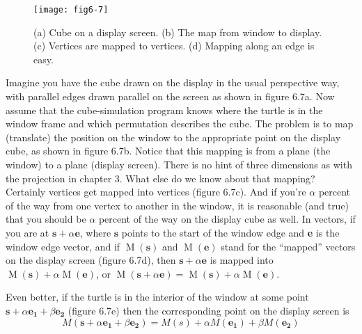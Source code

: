 \documentclass{book}
\begin{document}
\begin{figure}
\begin{center}
\texttt{[image: fig6-7]}
\caption{(a) Cube on a display screen. (b) The map from window to display. (c) Vertices are mapped to vertices. (d) Mapping along an edge is easy.}
\end{center}
\end{figure}

Imagine you have the cube drawn on the display in the usual perspective way, with parallel edges drawn parallel on the screen as shown in
figure 6.7a. Now assume that the cube-simulation program knows where
the turtle is in the window frame and which permutation describes the
cube. The problem is to map (translate) the position on the window to
the appropriate point on the display cube, as shown in figure 6.7b.
Notice that this mapping is from a plane (the window) to a plane
(display screen). There is no hint of three dimensions as with the
projection in chapter 3. What else do we know about that mapping?
Certainly vertices get mapped into vertices (figure 6.7c). And if you're
$\alpha$ percent of the way from one vertex to another in the window, it is
reasonable (and true) that you should be $\alpha$ percent of the way on the
display cube as well. In vectors, if you are at $\mathbf{s} + \alpha \mathbf{e}$, where $\mathbf{s}$ points to
the start of the window edge and \textbf{e} is the window edge vector, and if
$\operatorname{M}(\mathbf{s})$ and $\operatorname{M}(\mathbf{e})$ stand for the ``mapped'' vectors on the display screen
(figure 6.7d), then $\mathbf{s} + \alpha \mathbf{e}$ is mapped into $\operatorname{M}(\mathbf{s}) + \alpha \operatorname{M}(\mathbf{e})$, or
$\operatorname{M}(\mathbf{s} + \alpha \mathbf{e}) = \operatorname{M}(\mathbf{s}) + \alpha \operatorname{M}(\mathbf{e})$.

Even better, if the turtle is in the interior of the window at some point
$\mathbf{s} + \alpha \mathbf{e_1}+ \beta \mathbf{e_2}$ (figure 6.7e) then the corresponding point on the display
screen is
$$M(\mathbf{s} + \alpha \mathbf{e_1} + \beta \mathbf{e_2}) = M(s) + \alpha M(\mathbf{e_1}) + \beta M(\mathbf{e_2})$$
\end{document}
